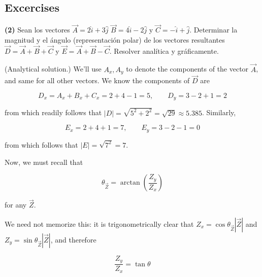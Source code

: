 \documentclass[12pt]{article}
\theoremstyle{definition}
\begin{document}
\pagebreak 

\subsection{Excercises}

\begin{shaded}
    \textbf{(2)} Sean los vectores $\overrightarrow{A} = 2\hat{i} + 3\hat{j}$
    $\overrightarrow{B} = 4\hat{i} -2 \hat{j}$ y $\overrightarrow{C} = -\hat{i}
    + \hat{j}$.
    Determinar la magnitud y el ángulo (representación polar) de los vectores
    resultantes $\overrightarrow{D} = \overrightarrow{A} + \overrightarrow{B} +
    \overrightarrow{C}$ y $\overrightarrow{E} = \overrightarrow{A} +
    \overrightarrow{B} - \overrightarrow{C}$. Resolver analítica y
    gráficamente.
\end{shaded}

(Analytical solution.) We'll use $A_x, A_y$ to denote the components of the
vector $\overrightarrow{A}$, and same for all other vectors. We know the
components of $\overrightarrow{D}$ are 

\begin{equation*}
    D_x = A_x + B_x + C_x = 2 + 4 - 1 = 5, \qquad D_y = 3 - 2 + 1 = 2
\end{equation*}

from which readily follows that $\left| D \right| = \sqrt{5^2 + 2^2} = \sqrt{29}
\approx 5.385$. Similarly, 

\begin{equation*}
    E_x = 2 + 4 + 1 = 7, \qquad E_y = 3 - 2 -1 = 0
\end{equation*}

from which follows that $\left| E \right| = \sqrt{7^2} = 7 $.

Now, we must recall that 

\begin{equation*}
    \theta_{\overrightarrow{Z}} = \arctan \left( \frac{Z_y}{Z_x} \right) 
\end{equation*}

for any $\overrightarrow{Z}$.


We need not memorize this: it is trigonometrically clear that 
$Z_x = \cos \theta_{\overrightarrow{Z}} \left| \overrightarrow{Z} \right| $ and 
$Z_y = \sin \theta_{\overrightarrow{Z}} \left| \overrightarrow{Z} \right| $, and
therefore 

\begin{equation*}
    \frac{Z_y}{Z_x} = \tan \theta
\end{equation*}
\end{document}
